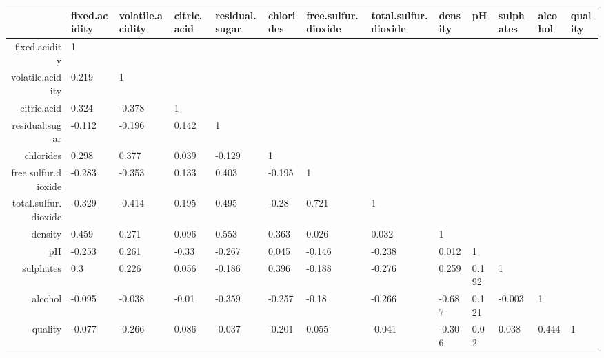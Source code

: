 \begin{table}[ht]
\centering
\begin{tabular}{rllllllllllll}
  \hline
 & fixed.acidity & volatile.acidity & citric.acid & residual.sugar & chlorides & free.sulfur.dioxide & total.sulfur.dioxide & density & pH & sulphates & alcohol & quality \\ 
  \hline
fixed.acidity & 1 &  &  &  &  &  &  &  &  &  &  &  \\ 
  volatile.acidity & 0.219 & 1 &  &  &  &  &  &  &  &  &  &  \\ 
  citric.acid & 0.324 & -0.378 & 1 &  &  &  &  &  &  &  &  &  \\ 
  residual.sugar & -0.112 & -0.196 & 0.142 & 1 &  &  &  &  &  &  &  &  \\ 
  chlorides & 0.298 & 0.377 & 0.039 & -0.129 & 1 &  &  &  &  &  &  &  \\ 
  free.sulfur.dioxide & -0.283 & -0.353 & 0.133 & 0.403 & -0.195 & 1 &  &  &  &  &  &  \\ 
  total.sulfur.dioxide & -0.329 & -0.414 & 0.195 & 0.495 & -0.28 & 0.721 & 1 &  &  &  &  &  \\ 
  density & 0.459 & 0.271 & 0.096 & 0.553 & 0.363 & 0.026 & 0.032 & 1 &  &  &  &  \\ 
  pH & -0.253 & 0.261 & -0.33 & -0.267 & 0.045 & -0.146 & -0.238 & 0.012 & 1 &  &  &  \\ 
  sulphates & 0.3 & 0.226 & 0.056 & -0.186 & 0.396 & -0.188 & -0.276 & 0.259 & 0.192 & 1 &  &  \\ 
  alcohol & -0.095 & -0.038 & -0.01 & -0.359 & -0.257 & -0.18 & -0.266 & -0.687 & 0.121 & -0.003 & 1 &  \\ 
  quality & -0.077 & -0.266 & 0.086 & -0.037 & -0.201 & 0.055 & -0.041 & -0.306 & 0.02 & 0.038 & 0.444 & 1 \\ 
   \hline
\end{tabular}
\end{table}
